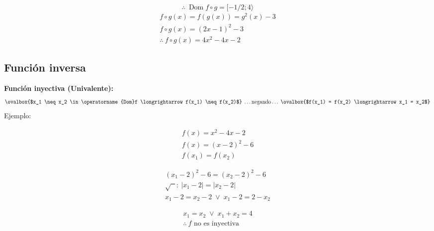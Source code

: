 \documentclass[11pt,a4paper]{article}
\begin{document}
\begin{center}
\end{center}
\[\therefore\ \operatorname{Dom}f\circ g = [-1/2; 4\rangle\]
\begin{gather*}
f\circ g(x) = f(g(x)) = g^2(x) - 3\\
f\circ g(x) = (2x - 1)^2 - 3\\
\therefore\ f\circ g(x) = 4x^2 - 4x - 2
\end{gather*}

\subsection*{Función inversa}

\textbf{Función inyectiva (Univalente):}
\[
\ovalbox{$x_1 \neq x_2 \in \operatorname{Dom}f \longrightarrow f(x_1) \neq f(x_2)$}
\;\ldots\text{negando}\ldots\;
\ovalbox{$f(x_1) = f(x_2) \longrightarrow x_1 = x_2$}
\]
Ejemplo:

\begin{minipage}[t]{0.320\textwidth}
\begin{gather*}
f(x) = x^2 - 4x - 2\\
f(x) = (x-2)^2 - 6\\
f(x_1) = f(x_2)
\end{gather*}
\end{minipage}\hfill
\begin{minipage}[t]{0.359\textwidth}
\begin{gather*}
(x_1 - 2)^2 - 6 = (x_2 - 2)^2 - 6\\
\sqrt{\phantom{x}}:\ |x_1 - 2| = |x_2 - 2|\\
x_1 - 2 = x_2 - 2 \;\vee\; x_1 - 2 = 2 - x_2
\end{gather*}
\end{minipage}\hfill
\begin{minipage}[t]{0.291\textwidth}
\begin{gather*}
x_1 = x_2 \;\vee\; \boxed{x_1 + x_2 = 4}\\
\therefore\ f \text{ no es inyectiva}
\end{gather*}
\end{minipage}
\end{document}
